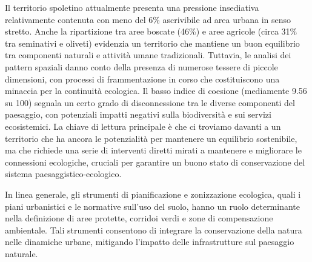 \documentclass[
]{book}
\begin{document}
Il territorio spoletino attualmente presenta una pressione insediativa relativamente contenuta con meno del 6\% ascrivibile ad area urbana in senso stretto. Anche la ripartizione tra aree boscate (46\%) e aree agricole (circa 31\% tra seminativi e oliveti) evidenzia un territorio che mantiene un buon equilibrio tra componenti naturali e attività umane tradizionali. Tuttavia, le analisi dei pattern spaziali danno conto della presenza di numerose tessere di piccole dimensioni, con processi di frammentazione in corso che costituiscono una minaccia per la continuità ecologica. Il basso indice di coesione (mediamente 9.56 su 100) segnala un certo grado di disconnessione tra le diverse componenti del paesaggio, con potenziali impatti negativi sulla biodiversità e sui servizi ecosistemici. La chiave di lettura principale è che ci troviamo davanti a un territorio che ha ancora le potenzialità per mantenere un equilibrio sostenibile, ma che richiede una serie di interventi diretti mirati a mantenere e migliorare le connessioni ecologiche, cruciali per garantire un buono stato di conservazione del sistema paesaggistico-ecologico.

In linea generale, gli strumenti di pianificazione e zonizzazione ecologica, quali i piani urbanistici e le normative sull'uso del suolo, hanno un ruolo determinante nella definizione di aree protette, corridoi verdi e zone di compensazione ambientale. Tali strumenti consentono di integrare la conservazione della natura nelle dinamiche urbane, mitigando l'impatto delle infrastrutture sul paesaggio naturale.
\end{document}
